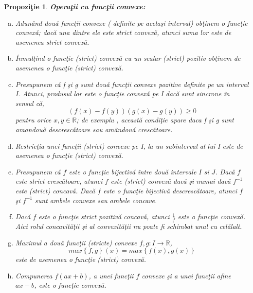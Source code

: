 \documentclass[a4paper,12pt,oneside]{report}
\newtheorem{proposition}{Propozi\c tie}
\begin{document}
\begin{proposition}
\textbf{Opera\c{t}ii cu func\c{t}ii convexe:}
\begin{enumerate}[a)]
\item Adun\^{a}nd dou\u{a} func\c{t}ii convexe ( definite pe acela\c{s}i interval) ob\c{t}inem o func\c{t}ie convex\u{a}; dac\u{a} una dintre ele este strict convex\u{a}, atunci suma lor este de asemenea strict convex\u{a}.
\item \^{I}nmul\c{t}ind o func\c{t}ie (strict) convex\u{a} cu un scalar (strict)  pozitiv ob\c{t}inem de asemenea o func\c{t}ie (strict) convex\u{a}.
\item Presupunem c\u{a} f \c{s}i g sunt dou\u{a} func\c{t}ii convexe pozitive definite pe un interval I. Atunci, produsul lor este o func\c{t}ie convex\u{a} pe I dac\u{a} sunt sincrone \^{i}n sensul c\u{a}, \begin{displaymath}
   \left ( f\left ( x \right ) - f\left ( y \right ) \right )\left ( g\left ( x \right ) - g\left ( y \right )\right )\geq 0
\end{displaymath} pentru orice \(x , y \in \mathbb{R}\); de exemplu , aceast\u{a} condi\c{t}ie apare daca f \c{s}i g sunt amandou\u{a} descresc\u{a}toare sau am\^{a}ndou\u{a} cresc\u{a}toare.
\item Restric\c{t}ia unei func\c{t}ii (strict) convexe pe I, la un subinterval al lui I este de asemenea o func\c{t}ie (strict) convex\u{a}.
\item Presupunem c\u{a} \(f\) este o func\c{t}ie bijectiv\u{a} \^{i}ntre dou\u{a} intervale \(I\) si \(J\). Dac\u{a} \(f\) este strict cresc\u{a}toare, atunci \(f\) este (strict) convex\u{a} dac\u{a} \c{s}i numai dac\u{a} \(f^{-1}\) este (strict) concav\u{a}. Dac\u{a} \(f\) este o func\c{t}ie bijectiv\u{a} descresc\u{a}toare, atunci \(f\) \c{s}i  \(f^{-1}\) sunt ambele convexe sau ambele concave.
\item Dac\u{a} \(f\) este o func\c{t}ie strict pozitiv\u{a} concav\u{a}, atunci \(\frac{1}{f}\) este o func\c{t}ie convex\u{a}. Aici rolul concavit\u{a}\c{t}ii \c{s}i al convexit\u{a}\c{t}ii nu poate fi schimbat unul cu cel\u{a}lalt.
\item Maximul a dou\u{a} func\c{t}ii (stricte) convexe \(f , g : I \rightarrow \mathbb{R}\),
\begin{displaymath}
  max \left \{ f , g \right \}\left ( x \right )=  max \left \{ f\left ( x \right ), g\left ( x \right ) \right \}
\end{displaymath} este de asemenea o func\c{t}ie (strict) convex\u{a}.
\item Compunerea \(f\left ( ax + b \right )\), a unei func\c{t}ii \(f\) convexe \c{s}i a unei func\c{t}ii afine \(ax+b\), este o func\c{t}ie convex\u{a}.
\end{enumerate}
\end{proposition}
\end{document}
